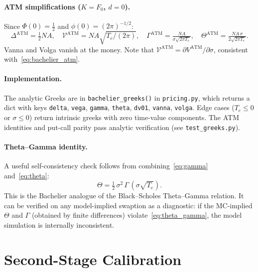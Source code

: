 \paragraph{ATM simplifications ($K=F_0$, $d=0$).}
Since $\Phi(0)=\tfrac{1}{2}$ and $\phi(0)=(2\pi)^{-1/2}$:
\begin{equation}
\Delta^{\mathrm{ATM}}  = \tfrac{1}{2}N\!A, \quad
\mathcal{V}^{\mathrm{ATM}} = N\!A\sqrt{T_e/(2\pi)}, \quad
\Gamma^{\mathrm{ATM}} = \tfrac{N\!A}{\sigma\sqrt{2\pi T_e}}, \quad
\Theta^{\mathrm{ATM}} = \tfrac{N\!A\,\sigma}{2\sqrt{2\pi T_e}}.
\label{eq:atm_greeks}
\end{equation}
Vanna and Volga vanish at the money. Note that $\mathcal{V}^{\mathrm{ATM}} =
\partial V^{\mathrm{ATM}}/\partial\sigma$, consistent with~\eqref{eq:bachelier_atm}.

\paragraph{Implementation.}
The analytic Greeks are in \texttt{bachelier\_greeks()} in \texttt{pricing.py}, which
returns a dict with keys \texttt{delta}, \texttt{vega}, \texttt{gamma}, \texttt{theta},
\texttt{dv01}, \texttt{vanna}, \texttt{volga}. Edge cases ($T_e\leq0$ or $\sigma\leq0$)
return intrinsic greeks with zero time-value components. The ATM identities and
put-call parity pass analytic verification (see \texttt{test\_greeks.py}).

\paragraph{Theta--Gamma identity.}
A useful self-consistency check follows from combining~\eqref{eq:gamma}
and~\eqref{eq:theta}:
\begin{equation}
    \Theta = \tfrac{1}{2}\,\sigma^2\,\Gamma\,(\sigma\sqrt{T_e}).
    \label{eq:theta_gamma}
\end{equation}
This is the Bachelier analogue of the Black--Scholes Theta--Gamma relation.  It can be
verified on any model-implied swaption as a diagnostic: if the MC-implied $\Theta$ and
$\Gamma$ (obtained by finite differences) violate~\eqref{eq:theta_gamma}, the model
simulation is internally inconsistent.

\section{Second-Stage Calibration}
\label{sec:second_stage_calibration}

